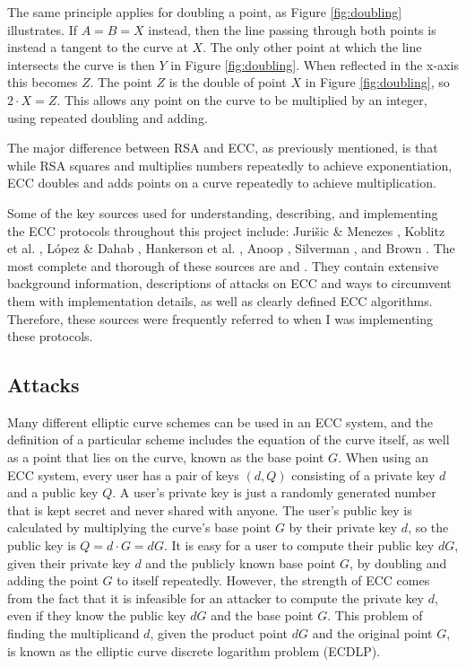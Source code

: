 \documentclass[12pt,a4paper]{article}
\begin{document}
The same principle applies for doubling a point, as Figure \ref{fig:doubling} illustrates. 
If $A = B = X$ instead, then the line passing through both points is instead a tangent to the curve at $X$. 
The only other point at which the line intersects the curve is then $Y$ in Figure \ref{fig:doubling}. 
When reflected in the x-axis this becomes $Z$. 
The point $Z$ is the double of point $X$ in Figure \ref{fig:doubling}, so $2 \cdot X = Z$. 
This allows any point on the curve to be multiplied by an integer, using repeated doubling and adding. 

The major difference between RSA and ECC, as previously mentioned, 
is that while RSA squares and multiplies numbers repeatedly to achieve exponentiation, 
ECC doubles and adds points on a curve repeatedly to achieve multiplication. 

Some of the key sources used for understanding, describing, and implementing the ECC protocols throughout this project include: 
Juri\v sic \& Menezes \citeyear{jurivsic1997elliptic}, Koblitz et al. \citeyear{koblitz2000state}, L\' opez \& Dahab \citeyear{lopez2000overview}, Hankerson et al. \citeyear{hankerson2003guide}, Anoop \citeyear{anoop2007elliptic}, Silverman \citeyear{silverman2009arithmetic}, and Brown \citeyear{brown2009standards}. 
The most complete and thorough of these sources are \cite{hankerson2003guide} and \cite{silverman2009arithmetic}. 
They contain extensive background information, descriptions of attacks on ECC and ways to circumvent them with implementation details, as well as clearly defined ECC algorithms. 
Therefore, these sources were frequently referred to when I was implementing these protocols. 


\subsection{Attacks} \noindent
Many different elliptic curve schemes can be used in an ECC system, 
and the definition of a particular scheme includes the equation of the curve itself, 
as well as a point that lies on the curve, known as the base point $G$. 
When using an ECC system, every user has a pair of keys $(d,Q)$ consisting of a private key $d$ and a public key $Q$. 
A user's private key is just a randomly generated number that is kept secret and never shared with anyone. 
The user's public key is calculated by multiplying the curve's base point $G$ by their private key $d$, 
so the public key is $Q = d \cdot G = dG$. 
It is easy for a user to compute their public key $dG$, given their private key $d$ and the publicly known base point $G$, 
by doubling and adding the point $G$ to itself repeatedly. 
However, the strength of ECC comes from the fact that it is infeasible for an attacker to compute the private key $d$, even if they know the public key $dG$ and the base point $G$. 
This problem of finding the multiplicand $d$, given the product point $dG$ and the original point $G$, 
is known as the elliptic curve discrete logarithm problem (ECDLP). 
\end{document}
